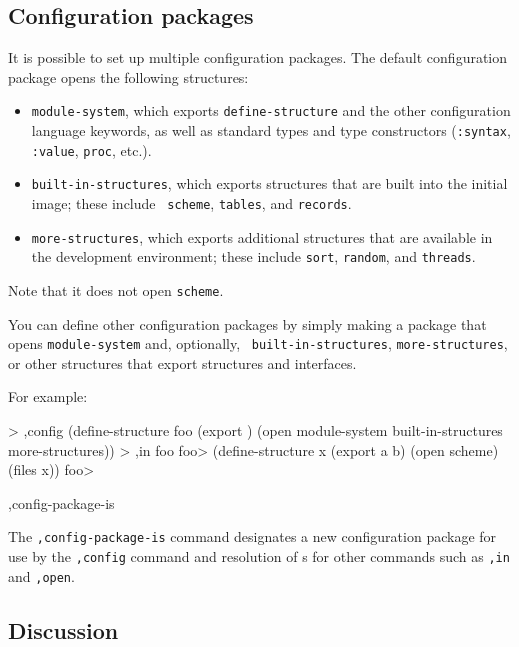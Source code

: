 \subsection*{Configuration packages}

It is possible to set up multiple configuration packages.  The default
configuration package opens the following structures:
\begin{itemize}
\item {\tt module-system}, which exports {\tt define-structure} and the
      other configuration language keywords, as well as standard types
      and type constructors ({\tt :syntax}, {\tt :value}, {\tt proc}, etc.).
\item {\tt built-in-structures}, which exports structures that are
      built into the initial \hack{} image; these include {\tt
      scheme}, {\tt tables}, and {\tt records}.
\item {\tt more-structures}, which exports additional structures that
      are available in the development environment; these include
      {\tt sort}, {\tt random}, and {\tt threads}.
\end{itemize}
Note that it does not open {\tt scheme}.

You can define other configuration packages by simply making a package
that opens {\tt module-system} and, optionally, {\tt
built-in-\ok{}structures}, {\tt more-\ok{}structures}, or other structures that
export structures and interfaces.

For example:
\begin{code}
    > ,config (define-structure foo (export )
                (open module-system
                      built-in-structures
                      more-structures))
    > ,in foo
    foo> (define-structure x (export a b)
           (open scheme)
           (files x))
    foo> 
\end{code}

\begin{list}{}{}{}
\item
\begin{code}
,config-package-is 
\end{code}
    The {\tt,config-package-is} command designates a new configuration
    package for use by the {\tt,config} command and resolution of
    s for other commands such as {\tt,in} and
    {\tt,open}.
\end{list}



\subsection*{Discussion}

